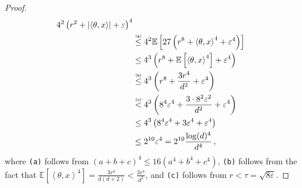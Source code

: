 \documentclass[letter, 12pt]{report}
\newcommand{\explan}[1]{\stackrel{\text{\tiny \texttt{#1}}}}
\newcommand{\ip}[1]{\left \langle #1 \right \rangle}
\newcommand{\paren}[1]{\left( #1 \right)}
\newcommand{\abs}[1]{\left| #1 \right|}
\newcommand{\brak}[1]{\left[ #1 \right]}
\newcommand{\E}{\mathbb E}
\newcommand{\1}{\mathbf{1}}
\renewcommand{\epsilon}{\varepsilon}
\theoremstyle{plain}
\theoremstyle{definition}
\theoremstyle{remark}
\begin{document}
\begin{proof}
\begin{align*}
{            4^2
            \paren{
                r^2
                +
                \abs{\ip{\theta, x}}
                +
                \epsilon
            }^4
        }
        \\
         &
        \explan{(a)}
        \leq
        4^2
        \E\brak{
            27
            \paren{
                r^8
                +
                \ip{\theta, x}^4
                +
                \epsilon^4
            }
        }
        \\
         & \leq
        4^3
        \paren{
            r^8
            +
            \E\brak{
                \ip{\theta, x}^4
            }
            +
            \epsilon^4
        }
        \\
         &
        \explan{(b)}
        \leq
        4^3
        \paren{
            r^8
            +
            \frac{3r^4}{d^2}
            +
            \epsilon^4
        }
        \\
         &
        \explan{(c)}
        <
        4^3
        \paren{
            8^4 \epsilon^4
            +
            \frac{3 \cdot 8^2 \epsilon^2}{d^2}
            +
            \epsilon^4
        }
        \\
         &
        \leq
        4^3
        \paren{
            8^4 \epsilon^4
            +
            3 \epsilon^4
            +
            \epsilon^4
        }
        \\
         & \leq 2^{10} \epsilon^4 = 2^{10} \frac{\log(d)^4}{d^4}
        \,,
    \end{align*}
    where \texttt{(a)} follows from $(a + b + c)^4 \leq 16(a^4 + b^4 + c^4)$,
    \texttt{(b)} follows from the fact that $\E[\ip{\theta, x}^4] = \frac{3r^4}{d(d+2)} < \frac{3r^4}{d^2}$,
    and \texttt{(c)} follows from $r < \tau = \sqrt{8\epsilon}$.
\end{proof}
\end{document}
